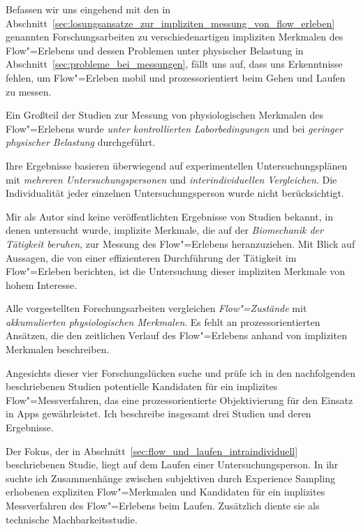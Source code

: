 

Befassen wir uns eingehend mit den in Abschnitt~\ref{sec:losungsansatze_zur_impliziten_messung_von_flow_erleben} genannten Forschungsarbeiten zu verschiedenartigen impliziten Merkmalen des Flow"=Erlebens und dessen Problemen unter physischer Belastung in Abschnitt~\ref{sec:probleme_bei_messungen}, fällt uns auf, dass uns Erkenntnisse fehlen, um Flow"=Erleben mobil und prozessorientiert beim Gehen und Laufen zu messen.

Ein Großteil der Studien zur Messung von physiologischen Merkmalen des Flow"=Erlebens wurde \emph{unter kontrollierten Laborbedingungen} und bei \emph{geringer physischer Belastung} durchgeführt. 

Ihre Ergebnisse basieren überwiegend auf experimentellen Untersuchungsplänen mit \emph{mehreren Untersuchungspersonen} und \emph{interindividuellen Vergleichen}. Die Individualität jeder einzelnen Untersuchungsperson wurde nicht berücksichtigt.

Mir als Autor sind keine veröffentlichten Ergebnisse von Studien bekannt, in denen untersucht wurde, implizite Merkmale, die auf der \emph{Biomechanik der Tätigkeit beruhen}, zur Messung des Flow"=Erlebens heranzuziehen. Mit Blick auf Aussagen, die von einer effizienteren Durchführung der Tätigkeit im Flow"=Erleben berichten, ist die Untersuchung dieser impliziten Merkmale von hohem Interesse.

Alle vorgestellten Forschungsarbeiten vergleichen \emph{Flow"=Zustände} mit \emph{akkumulierten physiologischen Merkmalen}. Es fehlt an prozessorientierten Ansätzen, die den zeitlichen Verlauf des Flow"=Erlebens anhand von impliziten Merkmalen beschreiben.

Angesichts dieser vier Forschungslücken suche und prüfe ich in den nachfolgenden beschriebenen Studien potentielle Kandidaten für ein implizites Flow"=Messverfahren, das eine prozessorientierte Objektivierung für den Einsatz in Apps gewährleistet. Ich beschreibe insgesamt drei Studien und deren Ergebnisse.

Der Fokus, der in Abschnitt~\ref{sec:flow_und_laufen_intraindividuell} beschriebenen Studie, liegt auf dem Laufen einer Untersuchungsperson. In ihr suchte ich Zusammenhänge zwischen subjektiven durch Experience Sampling erhobenen expliziten Flow"=Merkmalen und Kandidaten für ein implizites Messverfahren des Flow"=Erlebens beim Laufen. Zusätzlich diente sie als technische Machbarkeitsstudie. 


